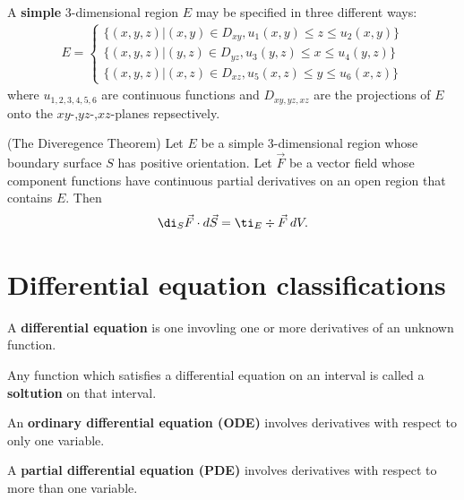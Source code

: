 \documentclass{article}
\begin{document}
\begin{definition}
	A \textbf{simple} 3-dimensional region $E$ may be specified in three different ways:
	\begin{align*}
		E=\begin{cases}
			  \{(x,y,z)|(x,y)\in D_{xy}, u_1(x,y)\leq z \leq u_2(x,y)\} \\
			  \{(x,y,z)|(y,z)\in D_{yz}, u_3(y,z)\leq x \leq u_4(y,z)\} \\
			  \{(x,y,z)|(x,z)\in D_{xz}, u_5(x,z)\leq y \leq u_6(x,z)\}
		  \end{cases}
	\end{align*}
	where $u_{1,2,3,4,5,6}$ are continuous functions and $D_{xy,yz,xz}$ are the projections
	of $E$ onto the $xy$-,$yz$-,$xz$-planes repsectively.
\end{definition}
\begin{theorem}(The Diveregence Theorem)
	Let $E$ be a simple 3-dimensional region whose boundary surface $S$ has positive
	orientation. Let $\vec F$ be a vector field whose component functions have continuous
	partial derivatives on an open region that contains $E$. Then
	\begin{align*}
		\di_S \vec F\cdot d\vec S = \ti_E \div\vec F\:dV.
	\end{align*}
\end{theorem}



\section{Differential equation classifications}



\begin{definition}
	A \textbf{differential equation} is one invovling one or more derivatives of an unknown function.
\end{definition}

\begin{definition}
	Any function which satisfies a differential equation on an interval is called a \textbf{soltution} on that interval.
\end{definition}

\begin{definition}
	An \textbf{ordinary differential equation (ODE)} involves derivatives with respect to only one variable.
\end{definition}

\begin{definition}
	A \textbf{partial differential equation (PDE)} involves derivatives with respect to more than one variable.
\end{definition}
\end{document}
